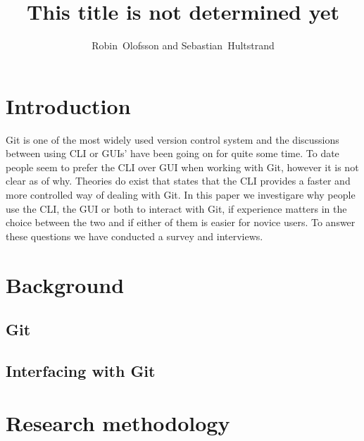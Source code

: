 \documentclass[12pt,a4paper,article,compsoc]{IEEEtran}
\begin{document}
	\title{This title is not determined yet}
	\author{Robin~Olofsson and Sebastian~Hultstrand}
	
		
		\maketitle
		
		\section{Introduction}
		Git is one of the most widely used version control system and the discussions between using CLI or GUIs' have been going on for quite some time.
		To date people seem to prefer the CLI over GUI when working with Git, however it is not clear as of why.
		Theories do exist that states that the CLI provides a faster and more controlled way of dealing with Git. \cite{GitUserSurvey}\cite{GitInClassroom}
		In this paper we investigare why people use the CLI, the GUI or both to interact with Git, if experience matters in the choice between the two and if either of them is easier for novice users.
		To answer these questions we have conducted a survey and interviews.
		
		\section{Background}
			\subsection{Git}
			\subsection{Interfacing with Git}
			
		
		\section{Research methodology}
\end{document}
